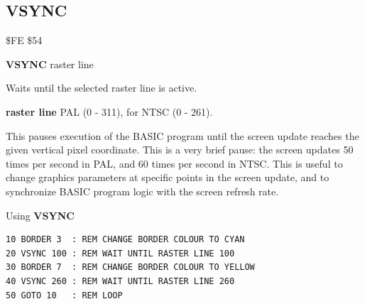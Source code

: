 \subsection{VSYNC}
\begin{description}[leftmargin=2cm,style=nextline]
\item [Token:]    \$FE \$54

\item [Format:]   {\bf VSYNC} raster line

\item [Usage:]    Waits until the selected raster line is active.

                  {\bf raster line} PAL (0 - 311), for NTSC (0 - 261).

                  This pauses execution of the BASIC program until the screen update reaches the given vertical pixel coordinate. This is a very brief pause: the screen updates 50 times per second in PAL, and 60 times per second in NTSC. This is useful to change graphics parameters at specific points in the screen update, and to synchronize BASIC program logic with the screen refresh rate.

\item [Example:]  Using {\bf VSYNC}

\begin{tcolorbox}[colback=black,coltext=white]
\verbatimfont{\codefont}
\begin{verbatim}
10 BORDER 3  : REM CHANGE BORDER COLOUR TO CYAN
20 VSYNC 100 : REM WAIT UNTIL RASTER LINE 100
30 BORDER 7  : REM CHANGE BORDER COLOUR TO YELLOW
40 VSYNC 260 : REM WAIT UNTIL RASTER LINE 260
50 GOTO 10   : REM LOOP
\end{verbatim}
\end{tcolorbox}
\end{description}


\newpage
